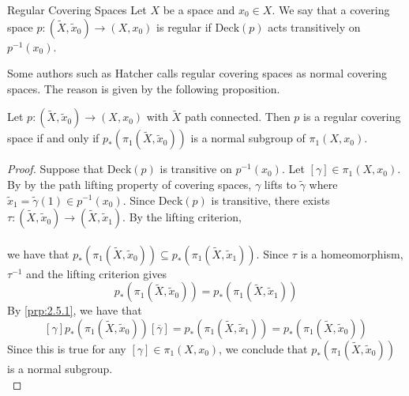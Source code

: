 \documentclass[a4paper]{article}
\begin{document}
\begin{defn}{Regular Covering Spaces}{} Let $X$ be a space and $x_0\in X$. We say that a covering space $p:(\tilde{X},\tilde{x}_0)\to(X,x_0)$ is regular if $\text{Deck}(p)$ acts transitively on $p^{-1}(x_0)$. 
\end{defn}

Some authors such as Hatcher calls regular covering spaces as normal covering spaces. The reason is given by the following proposition. 

\begin{prp}{}{} Let $p:(\tilde{X},\tilde{x}_0)\to (X,x_0)$ with $\tilde{X}$ path connected. Then $p$ is a regular covering space if and only if $p_\ast(\pi_1(\tilde{X},\tilde{x}_0))$ is a normal subgroup of $\pi_1(X,x_0)$. 
\begin{proof}
Suppose that $\text{Deck}(p)$ is transitive on $p^{-1}(x_0)$. Let $[\gamma]\in\pi_1(X,x_0)$. By by the path lifting property of covering spaces, $\gamma$ lifts to $\tilde{\gamma}$ where $\tilde{x}_1=\tilde{\gamma}(1)\in p^{-1}(x_0)$. Since $\text{Deck}(p)$ is transitive, there exists $\tau:(\tilde{X},\tilde{x}_0)\to(\tilde{X},\tilde{x}_1)$. By the lifting criterion, \\
\\
we have that $p_\ast(\pi_1(\tilde{X},\tilde{x}_0))\subseteq p_\ast(\pi_1(\tilde{X},\tilde{x}_1))$. Since $\tau$ is a homeomorphism, $\tau^{-1}$ and the lifting criterion gives $$p_\ast(\pi_1(\tilde{X},\tilde{x}_0))=p_\ast(\pi_1(\tilde{X},\tilde{x}_1))$$ By \ref{prp:2.5.1}, we have that $$[\gamma]p_\ast(\pi_1(\tilde{X},\tilde{x}_0))[\overline{\gamma}]=p_\ast(\pi_1(\tilde{X},\tilde{x}_1))=p_\ast(\pi_1(\tilde{X},\tilde{x}_0))$$ Since this is true for any $[\gamma]\in\pi_1(X,x_0)$, we conclude that $p_\ast(\pi_1(\tilde{X},\tilde{x}_0))$ is a normal subgroup. \\


\end{proof}
\end{prp}
\end{document}
